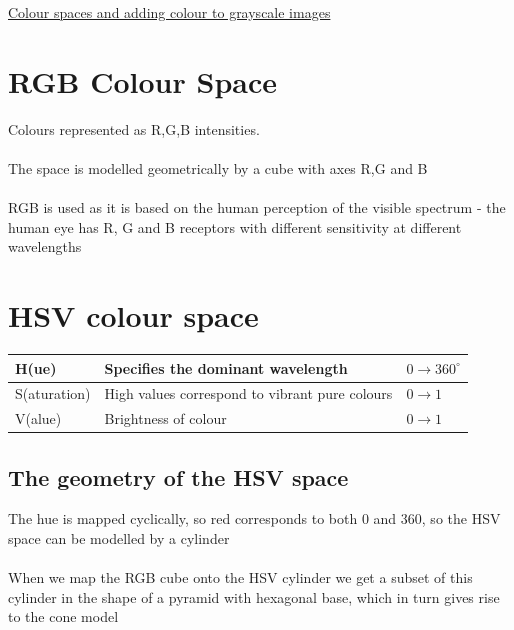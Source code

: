 \documentclass{article}[18pt]
\begin{document}
\begin{center}
\underline{\huge Colour spaces and adding colour to grayscale images}
\end{center}
\section{RGB Colour Space}
Colours represented as R,G,B intensities.\\
\\
The space is modelled geometrically by a cube with axes R,G and B\\
\\
RGB is used as it is based on the human perception of the visible spectrum - the human eye has R, G and B receptors with different sensitivity at different wavelengths
{\renewcommand{\arraystretch}{2}
\section{HSV colour space}
\begin{tabularx}{\textwidth}{|X|X|X|}
\hline
H(ue)& Specifies the dominant wavelength & $0 \rightarrow 360^\circ$\\
\hline
S(aturation)& High values correspond to vibrant pure colours& $0\rightarrow 1$\\
\hline
V(alue)&Brightness of colour& $0\rightarrow 1$\\
\hline
\end{tabularx}}
\subsection{The geometry of the HSV space}
The hue is mapped cyclically, so red corresponds to both 0 and 360, so the HSV space can be modelled by a cylinder\\
\\
When we map the RGB cube onto the HSV cylinder we get a subset of this cylinder in the shape of a pyramid with hexagonal base, which in turn gives rise to the cone model
\end{document}
